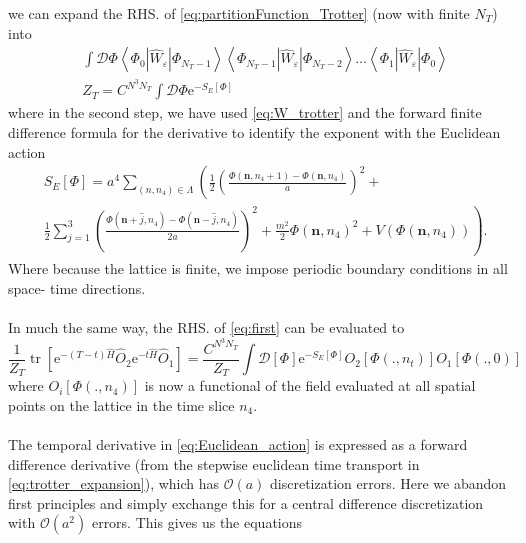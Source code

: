 \documentclass[a4paper,10pt]{article}
\begin{document}
we can expand the RHS. of \eqref{eq:partitionFunction_Trotter} (now with finite $N_T$) into 
\begin{equation}\label{eq:trotter_expansion}
\begin{aligned}
&\int \mathcal{D} \Phi \left\langle\Phi_0\left|\widehat{W}_{\varepsilon}\right| \Phi_{N_{T}-1}\right\rangle\left\langle\Phi_{N_{T}-1}\left|\widehat{W}_{\varepsilon}\right| \Phi_{N_{T}-2}\right\rangle \ldots\left\langle\Phi_{1}\left|\widehat{W}_{\varepsilon}\right| \Phi_{0}\right\rangle \\
&Z_T=C^{N^{3} N_{T}} \int \mathcal{D} \Phi  \mathrm{e}^{-S_{E}[\Phi]}
\end{aligned}
\end{equation}
where in the second step, we have used \eqref{eq:W_trotter} and the forward finite difference formula for the derivative to identify the exponent with the Euclidean action
\begin{equation}\label{eq:Euclidean_action}
\begin{aligned}
&S_{E}[\Phi]= a^{4} \sum_{\left(n, n_{4}\right) \in \Lambda}\left(\frac{1}{2}\left(\frac{\Phi\left(\boldsymbol{n}, n_{4}+1\right)-\Phi\left(\boldsymbol{n}, n_{4}\right)}{a}\right)^{2}+\right. \\
&\left.\frac{1}{2} \sum_{j=1}^{3}\left(\frac{\Phi\left(\boldsymbol{n}+\hat{j}, n_{4}\right)-\Phi\left(\boldsymbol{n}-\hat{j}, n_{4}\right)}{2 a}\right)^{2}+\frac{m^{2}}{2} \Phi\left(\boldsymbol{n}, n_{4}\right)^{2}+V\left(\Phi\left(\boldsymbol{n}, n_{4}\right)\right)\right).
\end{aligned}
\end{equation}
Where because the lattice is finite, we impose periodic boundary conditions in all space- time directions.\\\\ In much the same way, the RHS. of \eqref{eq:first} can be evaluated to
\begin{equation}
\frac{1}{Z_{T}} \operatorname{tr}\left[\mathrm{e}^{-(T-t) \hat{H}} \widehat{O}_{2} \mathrm{e}^{-t \hat{H}} \widehat{O}_{1}\right]=\frac{C^{N^{3} N_{T}}}{Z_{T}} \int \mathcal{D}[\Phi] \mathrm{e}^{-S_{E}[\Phi]} O_{2}\left[\Phi\left(., n_{t}\right)\right] O_{1}[\Phi(., 0)]
\end{equation}
where $O_{i}[\Phi(., n_4)]$ is now a functional of the field evaluated at all spatial points on the lattice in the time slice $n_4$.\\\\The temporal derivative in \eqref{eq:Euclidean_action} is expressed as a forward difference derivative (from the stepwise euclidean time transport in \eqref{eq:trotter_expansion}), which has $\mathcal{O}(a)$ discretization errors. Here we abandon first principles and simply exchange this for a central difference discretization with $\mathcal{O}(a^2)$ errors. This gives us the equations 
\end{document}
